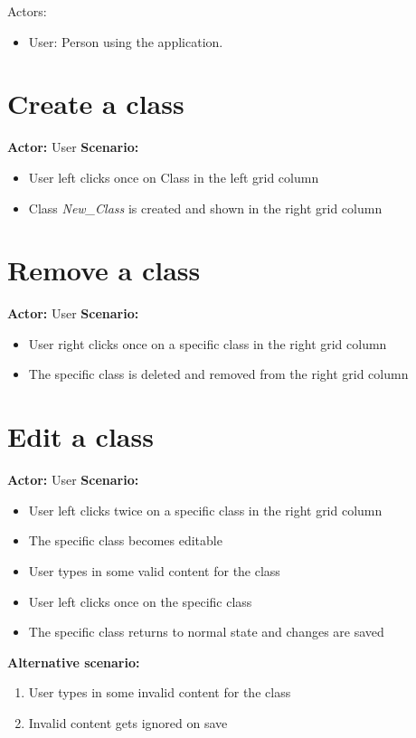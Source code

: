 Actors:
\begin{itemize}
\item User: Person using the application.
\end{itemize}

\section{Create a class}
\textbf{Actor:} User
\textbf{Scenario:}
\begin{itemize}
\item User left clicks once on Class in the left grid column
\item Class \textit{New\_Class} is created and shown in the right grid column
\end{itemize}

\section{Remove a class}
\textbf{Actor:} User
\textbf{Scenario:}
\begin{itemize}
\item User right clicks once on a specific class in the right grid column
\item The specific class is deleted and removed from the right grid column
\end{itemize}

\section{Edit a class}
\textbf{Actor:} User
\textbf{Scenario:}
\begin{itemize}
\item User left clicks twice on a specific class in the right grid column
\item The specific class becomes editable
\item User types in some valid content for the class
\item User left clicks once on the specific class
\item The specific class returns to normal state and changes are saved
\end{itemize}
\textbf{Alternative scenario:} 
\begin{enumerate}
\item User types in some invalid content for the class
\item Invalid content gets ignored on save
\end{enumerate}

